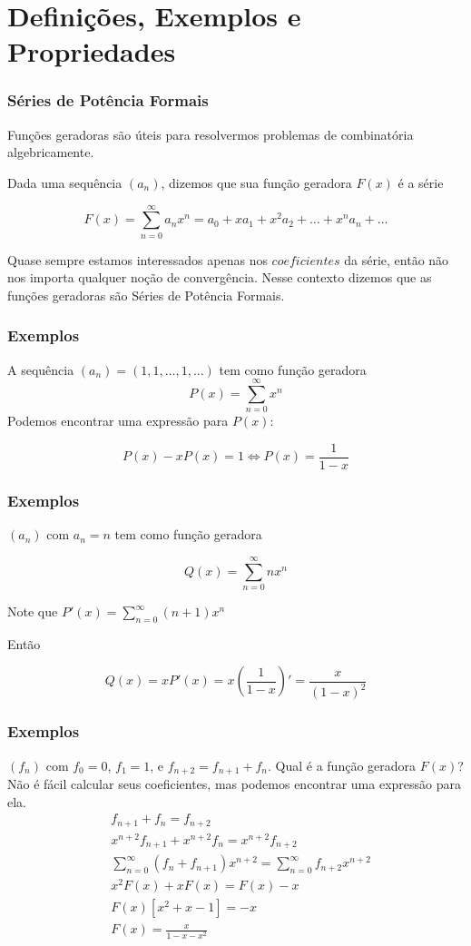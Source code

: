 \documentclass{beamer}
\begin{document}
\section{Definições, Exemplos e Propriedades}

\begin{frame}
\frametitle{Séries de Potência Formais}
      Funções geradoras são úteis para resolvermos problemas de combinatória algebricamente.


      Dada uma sequência $(a_n)$, dizemos que sua função geradora $F(x)$ é a série 

      $$
      F(x) = \sum_{n=0}^{\infty} a_n x^n = a_0 + x a_1 + x^2 a_2 + \dots + x^n a_n + \dots
      $$

      Quase sempre estamos interessados apenas nos $\textit{coeficientes}$ da série, então não nos importa qualquer noção de convergência. Nesse contexto dizemos que as funções geradoras são Séries de Potência Formais.
\end{frame}

\begin{frame}
\frametitle{Exemplos}
      A sequência $(a_n) = (1, 1, \dots, 1, \dots)$ tem como função geradora 
      $$
      P(x) = \sum_{n=0}^{\infty} x^n
      $$
      Podemos encontrar uma expressão para $P(x)$:

      $$P(x) - x P(x) = 1 \iff P(x) = \frac{1}{1-x}
      $$


\end{frame}

\begin{frame}
\frametitle{Exemplos}
      $(a_n)$ com $a_n = n$ tem como função geradora

      $$
      Q(x) = \sum_{n=0}^{\infty} n x^n
      $$

      Note que $P'(x) = \sum_{n=0}^{\infty} (n+1) x^{n}$

      Então

      $$
      Q(x) = x P'(x) = x (\frac{1}{1-x})' = \frac{x}{(1-x)^2}
      $$

\end{frame}

\begin{frame}
\frametitle{Exemplos}
      $(f_n)$ com $f_0 = 0$, $f_1 = 1$, e $f_{n+2} = f_{n+1} + f_n$. Qual é a função geradora $F(x)$? Não é fácil calcular seus coeficientes, mas podemos encontrar uma expressão para ela.
      \begin{align*}
      &f_{n+1} + f_n = f_{n+2} \\
      &x^{n+2} f_{n+1} + x^{n+2} f_n = x^{n+2} f_{n+2} \\
      &\sum_{n=0}^{\infty} (f_n + f_{n+1}) x^{n+2} = \sum_{n=0}^{\infty} f_{n+2} x^{n+2} \\
      &x^2 F(x) + x F(x) = F(x) - x \\
      &F(x) [x^2 +  x - 1] = -x\\
      &F(x) = \frac{x}{1-x-x^2}
      \end{align*}

\end{frame}
\end{document}
